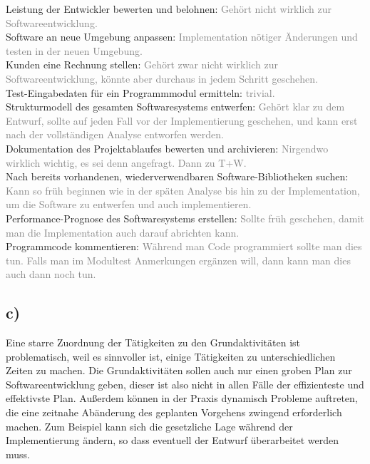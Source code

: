 \documentclass[a4paper,11pt]{scrartcl}
\begin{document}
	Leistung der Entwickler bewerten und belohnen: \textcolor{gray}{Gehört nicht wirklich zur Softwareentwicklung.}\\
	Software an neue Umgebung anpassen: \textcolor{gray}{Implementation nötiger Änderungen und testen in der neuen Umgebung.}\\		
	Kunden eine Rechnung stellen: \textcolor{gray}{Gehört zwar nicht wirklich zur Softwareentwicklung, könnte aber durchaus in jedem Schritt geschehen.}\\	
	Test-Eingabedaten für ein Programmmodul ermitteln: \textcolor{gray}{trivial.}\\
	Strukturmodell des gesamten Softwaresystems entwerfen: \textcolor{gray}{Gehört klar zu dem Entwurf, sollte auf jeden Fall vor der Implementierung geschehen, und kann erst nach der vollständigen Analyse entworfen werden.}\\
	Dokumentation des Projektablaufes bewerten und archivieren: \textcolor{gray}{Nirgendwo wirklich wichtig, es sei denn angefragt. Dann zu T+W.}\\	
	Nach bereits vorhandenen, wiederverwendbaren Software-Bibliotheken suchen: \textcolor{gray}{Kann so früh beginnen wie in der späten Analyse bis hin zu der Implementation, um die Software zu entwerfen und auch implementieren.}\\
	Performance-Prognose des Softwaresystems erstellen: \textcolor{gray}{Sollte früh geschehen, damit man die Implementation auch darauf abrichten kann.}\\
	Programmcode kommentieren: \textcolor{gray}{Während man Code programmiert sollte man dies tun. Falls man im Modultest Anmerkungen ergänzen will, dann kann man dies auch dann noch tun.}\\		
	
	\subsection*{c)}
	Eine starre Zuordnung der Tätigkeiten zu den Grundaktivitäten ist problematisch, weil es sinnvoller ist, einige Tätigkeiten zu unterschiedlichen Zeiten zu machen. Die Grundaktivitäten sollen auch nur einen groben Plan zur Softwareentwicklung geben, dieser ist also nicht in allen Fälle der effizienteste und effektivste Plan. Außerdem können in der Praxis dynamisch Probleme auftreten, die eine zeitnahe Abänderung des geplanten Vorgehens zwingend erforderlich machen. Zum Beispiel kann sich die gesetzliche Lage während der Implementierung ändern, so dass eventuell der Entwurf überarbeitet werden muss.
	
\end{document}
